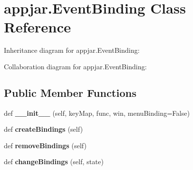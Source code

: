\hypertarget{classappjar_1_1_event_binding}{}\section{appjar.\+Event\+Binding Class Reference}
\label{classappjar_1_1_event_binding}


Inheritance diagram for appjar.\+Event\+Binding\+:


Collaboration diagram for appjar.\+Event\+Binding\+:
\subsection*{Public Member Functions}
\begin{DoxyCompactItemize}
\item 
\mbox{\label{classappjar_1_1_event_binding_aa881291141fb6bbcc8d110056029f400}} 
def {\bfseries \+\_\+\+\_\+init\+\_\+\+\_\+} (self, key\+Map, func, win, menu\+Binding=False)
\item 
\mbox{\label{classappjar_1_1_event_binding_ac9594044d324fcf5a3d0348f44edd488}} 
def {\bfseries create\+Bindings} (self)
\item 
\mbox{\label{classappjar_1_1_event_binding_a33136021d719d9faaf66d3acf2eafb43}} 
def {\bfseries remove\+Bindings} (self)
\item 
\mbox{\label{classappjar_1_1_event_binding_aa2ce1f7a404736449eb8683a5e8c3b83}} 
def {\bfseries change\+Bindings} (self, state)
\end{DoxyCompactItemize}
